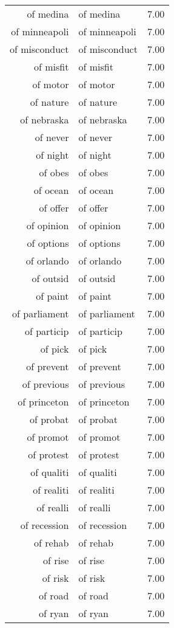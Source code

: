 \begin{table}[ht]
\begin{tabular}{rlr}
  of medina & of medina & 7.00 \\ 
  of minneapoli & of minneapoli & 7.00 \\ 
  of misconduct & of misconduct & 7.00 \\ 
  of misfit & of misfit & 7.00 \\ 
  of motor & of motor & 7.00 \\ 
  of nature & of nature & 7.00 \\ 
  of nebraska & of nebraska & 7.00 \\ 
  of never & of never & 7.00 \\ 
  of night & of night & 7.00 \\ 
  of obes & of obes & 7.00 \\ 
  of ocean & of ocean & 7.00 \\ 
  of offer & of offer & 7.00 \\ 
  of opinion & of opinion & 7.00 \\ 
  of options & of options & 7.00 \\ 
  of orlando & of orlando & 7.00 \\ 
  of outsid & of outsid & 7.00 \\ 
  of paint & of paint & 7.00 \\ 
  of parliament & of parliament & 7.00 \\ 
  of particip & of particip & 7.00 \\ 
  of pick & of pick & 7.00 \\ 
  of prevent & of prevent & 7.00 \\ 
  of previous & of previous & 7.00 \\ 
  of princeton & of princeton & 7.00 \\ 
  of probat & of probat & 7.00 \\ 
  of promot & of promot & 7.00 \\ 
  of protest & of protest & 7.00 \\ 
  of qualiti & of qualiti & 7.00 \\ 
  of realiti & of realiti & 7.00 \\ 
  of realli & of realli & 7.00 \\ 
  of recession & of recession & 7.00 \\ 
  of rehab & of rehab & 7.00 \\ 
  of rise & of rise & 7.00 \\ 
  of risk & of risk & 7.00 \\ 
  of road & of road & 7.00 \\ 
  of ryan & of ryan & 7.00 \\ 

\end{tabular}
\end{table}
